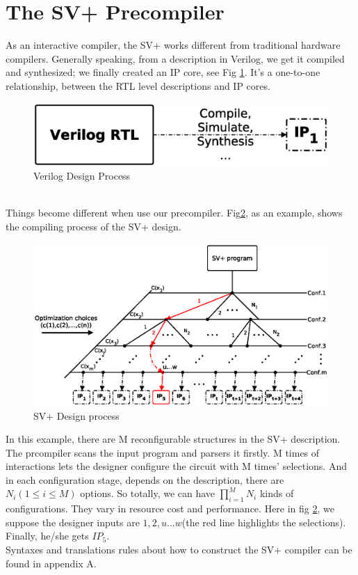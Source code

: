 \section{The SV+ Precompiler}\label{sec:compiler}
As an interactive compiler, the SV+ works different from traditional hardware compilers.
Generally speaking, from a description in Verilog, we get it compiled and synthesized; we finally created an IP core, see Fig \ref{fig-ipdesign}. It's a one-to-one relationship, between the RTL level descriptions and IP cores.
\begin{figure}[h]
\centering
\includegraphics[width=0.5\columnwidth]{IPDesign}
\caption{Verilog Design Process}
\label{fig-ipdesign}
\end{figure}
\\
Things become different when use our precompiler. Fig\ref{fig-compiler}, as an example, shows the compiling process of the SV+ design.
\begin{figure}[h]
\centering
\includegraphics[scale=.4]{compileprocess}
\caption{SV+ Design process}
\label{fig-compiler}
\end{figure}
In this example, there are M reconfigurable structures in the SV+ description. The prcompiler scans the input program and parsers it firstly. M times of interactions lets the designer configure the circuit with M times' selections. And in each configuration stage, depends on the description, there are $N_i (1\leq i\leq M)$ options. So totally, we can have $\prod_{i=1}^{M}N_{i}$ kinds of configurations. They vary in resource cost and performance. Here in fig \ref{fig-compiler}, we suppose the designer inputs are $1,2,u...w$(the red line highlights the selections). Finally, he/she gets $\mathit{IP_5}$.
\\
Syntaxes and translations rules about how to construct the SV+ compiler can be found in appendix A.
